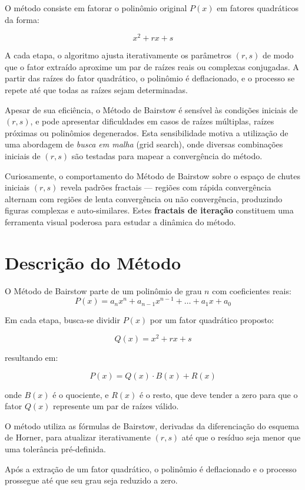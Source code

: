 \documentclass[12pt]{article}
\begin{document}
O método consiste em fatorar o polinômio original $P(x)$ em fatores quadráticos da forma:

\[
x^2 + rx + s
\]

A cada etapa, o algoritmo ajusta iterativamente os parâmetros $(r, s)$ de modo que o fator extraído aproxime um par de raízes reais ou complexas conjugadas. A partir das raízes do fator quadrático, o polinômio é deflacionado, e o processo se repete até que todas as raízes sejam determinadas.

Apesar de sua eficiência, o Método de Bairstow é sensível às condições iniciais de $(r, s)$, e pode apresentar dificuldades em casos de raízes múltiplas, raízes próximas ou polinômios degenerados. Esta sensibilidade motiva a utilização de uma abordagem de \textit{busca em malha} (grid search), onde diversas combinações iniciais de $(r, s)$ são testadas para mapear a convergência do método.

Curiosamente, o comportamento do Método de Bairstow sobre o espaço de chutes iniciais $(r, s)$ revela padrões fractais — regiões com rápida convergência alternam com regiões de lenta convergência ou não convergência, produzindo figuras complexas e auto-similares. Estes \textbf{fractais de iteração} constituem uma ferramenta visual poderosa para estudar a dinâmica do método.


\section{Descrição do Método}

O Método de Bairstow parte de um polinômio de grau $n$ com coeficientes reais:
\[
P(x) = a_n x^n + a_{n-1} x^{n-1} + \ldots + a_1 x + a_0
\]

Em cada etapa, busca-se dividir $P(x)$ por um fator quadrático proposto:

\[
Q(x) = x^2 + rx + s
\]

resultando em:

\[
P(x) = Q(x) \cdot B(x) + R(x)
\]

onde $B(x)$ é o quociente, e $R(x)$ é o resto, que deve tender a zero para que o fator $Q(x)$ represente um par de raízes válido.

O método utiliza as fórmulas de Bairstow, derivadas da diferenciação do esquema de Horner, para atualizar iterativamente $(r, s)$ até que o resíduo seja menor que uma tolerância pré-definida.

Após a extração de um fator quadrático, o polinômio é deflacionado e o processo prossegue até que seu grau seja reduzido a zero.
\end{document}
